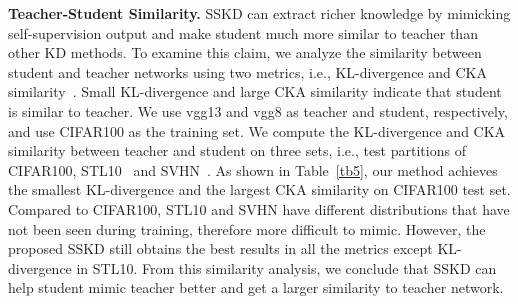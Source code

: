 \documentclass[runningheads]{llncs}
\newcommand{\ie}{i.e.}
\begin{document}
\noindent
\textbf{Teacher-Student Similarity.}
SSKD can extract richer knowledge by mimicking self-supervision output and make student much more similar to teacher than other KD methods. To examine this claim, we analyze the similarity between student and teacher networks using two metrics, i.e., KL-divergence and CKA similarity~\cite{cka}. Small KL-divergence and large CKA similarity indicate that student is similar to teacher.
We use vgg13 and vgg8 as teacher and student, respectively, and use CIFAR100 as the training set. We compute the KL-divergence and CKA similarity between teacher and student on three sets, \ie, test partitions of CIFAR100, STL10~\cite{stl10} and SVHN~\cite{SVHN}.
As shown in Table~\ref{tb5}, our method achieves the smallest KL-divergence and the largest CKA similarity on CIFAR100 test set. Compared to CIFAR100, STL10 and SVHN have different distributions that have not been seen during training, therefore more difficult to mimic. However, the proposed SSKD still obtains the best results in all the metrics except KL-divergence in STL10.
From this similarity analysis, we conclude that SSKD can help student mimic teacher better and get a larger similarity to teacher network.
\end{document}
